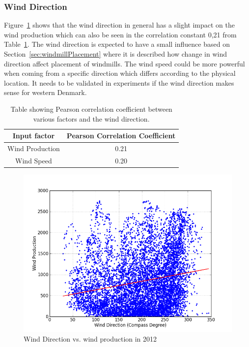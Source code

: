 \subsubsection{Wind Direction}
Figure~\ref{fig:windDirVsProd} shows that the wind direction in general has a slight impact on the wind production which can also be seen in the correlation constant 0,21 from Table~\ref{table:pearsonCoeficientWindDirection}. The wind direction is expected to have a small influence based on Section~\ref{sec:windmillPlacement} where it is described how change in wind direction affect placement of windmills. The wind speed could be more powerful when coming from a specific direction which differs according to the physical location. It needs to be validated in experiments if the wind direction makes sense for western Denmark.
 
\begin{table}[H]
\centering  %
\begin{tabular}{|c|c|} %
\hline
Input factor & Pearson Correlation Coefficient \\ %
\hline                  %
Wind Production & 0.21 \\ \hline %
Wind Speed & 0.20 \\ \hline %
\hline %
\end{tabular}
\caption{Table showing Pearson correlation coefficient between various factors and the wind direction.} %
\label{table:pearsonCoeficientWindDirection} %
\end{table}

\begin{figure}[H]
\centering
\includegraphics[width=0.99\linewidth,natwidth=898,natheight=587]{billeder/productionVsWindDirection.png}
\caption{Wind Direction vs. wind production in 2012}
\label{fig:windDirVsProd}
\end{figure}

